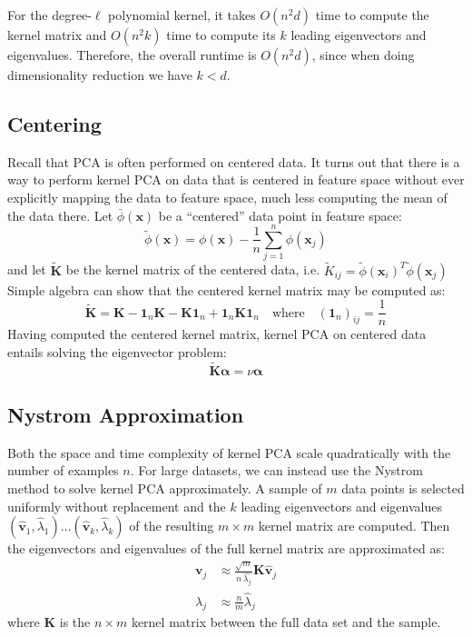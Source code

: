\documentclass[]{article}
\begin{document}
For the degree-$\ell$ polynomial kernel, it takes $O(n^2 d)$ time to compute the kernel matrix and $O(n^2k)$ time to compute its $k$ leading eigenvectors and eigenvalues.
Therefore, the overall runtime is $O(n^2 d)$, since when doing dimensionality reduction we have $k < d$.

\subsection{Centering}

Recall that PCA is often performed on centered data.
It turns out that there is a way to perform kernel PCA on data that is centered in feature space without ever explicitly mapping the data to feature space, much less computing the mean of the data there.
Let $\bar{\phi}(\mathbf{x})$ be a ``centered'' data point in feature space:
$$  \tilde{\phi}(\mathbf{x}) = \phi(\mathbf{x}) - \frac{1}{n} \sum_{j=1}^n \phi(\mathbf{x}_j) $$
and let $\tilde{\mathbf{K}}$ be the kernel matrix of the centered data, i.e. $\tilde{K}_{ij} = \tilde{\phi}(\mathbf{x}_i)^T \tilde{\phi}(\mathbf{x}_j)$
Simple algebra can show that the centered kernel matrix may be computed as:
$$\tilde{\mathbf{K}} =  \mathbf{K} - \mathbf{1}_n \mathbf{K}  - \mathbf{K} \mathbf{1}_n + \mathbf{1}_n \mathbf{K} \mathbf{1}_n \quad \text{where} \quad (\mathbf{1}_n)_{ij} = \frac{1}{n} $$
Having computed the centered kernel matrix, kernel PCA on centered data entails solving the eigenvector problem:
$$ \tilde{\mathbf{K}} \boldsymbol{\alpha} = \nu \boldsymbol{\alpha} $$

\subsection{Nystrom Approximation}

Both the space and time complexity of kernel PCA scale quadratically with the number of examples $n$.
For large datasets, we can instead use the Nystrom method \cite{williams2001} to solve kernel PCA approximately. 
A sample of $m$ data points is selected uniformly without replacement and the $k$ leading eigenvectors and eigenvalues $(\hat{\mathbf{v}}_1, \hat{\lambda}_1) \hdots (\hat{\mathbf{v}}_k, \hat{\lambda}_k)  $ of the resulting $m \times m$ kernel matrix are computed.
Then the eigenvectors and eigenvalues of the full kernel matrix are approximated as:
\begin{align}
\mathbf{v}_j &\approx \frac{\sqrt m}{n \, \hat{\lambda_j}} \mathbf{K} \hat{\mathbf{v}}_j \\
\lambda_j &\approx \frac{n}{m} \hat{\lambda}_j
\end{align}
where $\mathbf{K}$ is the $n \times m$ kernel matrix between the full data set and the sample. 
\end{document}
